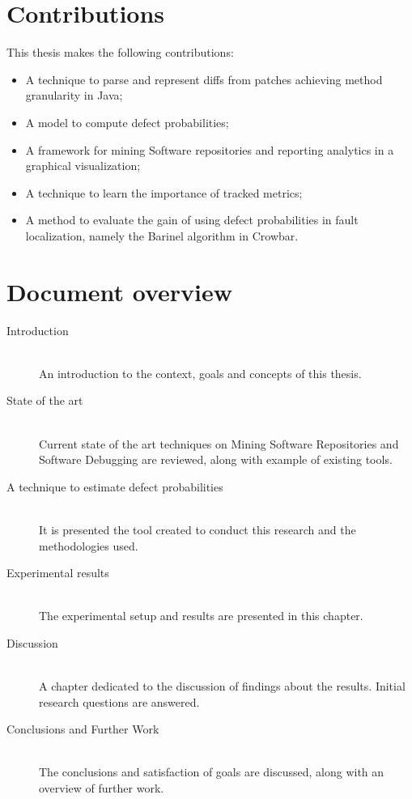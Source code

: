 \section{Contributions}
This thesis makes the following contributions:

\begin{itemize}
\item A technique to parse and represent diffs from patches achieving method
granularity in Java;
\item A model to compute defect probabilities;
\item A framework for mining Software repositories and reporting analytics
in a graphical visualization;
\item A technique to learn the importance of tracked metrics;
\item A method to evaluate the gain of using defect probabilities in fault
 localization, namely the Barinel algorithm in Crowbar.
\end{itemize}

\section{Document overview}
\begin{description}
  \item[Introduction] \hfill \\
  An introduction to the context, goals and concepts of this thesis.

  \item[State of the art] \hfill \\
  Current state of the art techniques on Mining Software Repositories and
  Software Debugging are reviewed, along with example of existing tools.

  \item[A technique to estimate defect probabilities] \hfill \\
  It is presented the tool created to conduct this research and the
  methodologies used.

  \item[Experimental results] \hfill \\
  The experimental setup and results are presented in this chapter.

  \item[Discussion] \hfill \\
  A chapter dedicated to the discussion of findings about the results.
  Initial research questions are answered.

  \item[Conclusions and Further Work] \hfill \\
  The conclusions and satisfaction of goals are discussed, along with an
  overview of further work.

\end{description}
